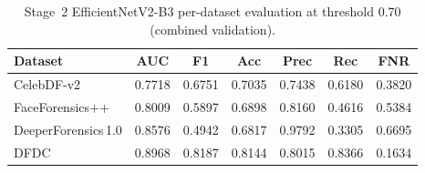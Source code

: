 \begin{table}[h]
  \centering
  \caption{Stage~2 EfficientNetV2-B3 per-dataset evaluation at threshold 0.70 (combined validation).}
  \label{tab:stage2_per_dataset}
  {\small
  \begin{tabular}{lcccccc}\toprule
  Dataset & AUC & F1 & Acc & Prec & Rec & FNR \\ \midrule
  CelebDF-v2 & 0.7718 & 0.6751 & 0.7035 & 0.7438 & 0.6180 & 0.3820 \\
  FaceForensics++ & 0.8009 & 0.5897 & 0.6898 & 0.8160 & 0.4616 & 0.5384 \\
  DeeperForensics\,1.0 & 0.8576 & 0.4942 & 0.6817 & 0.9792 & 0.3305 & 0.6695 \\
  DFDC & 0.8968 & 0.8187 & 0.8144 & 0.8015 & 0.8366 & 0.1634 \\
  \bottomrule
  \end{tabular}}
\end{table}
